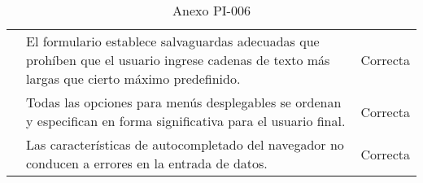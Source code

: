 \begin{table}[htpb]
\begin{tabularx}{\textwidth}{|l|X|l|}
                                         & El formulario establece salvaguardas adecuadas que prohíben que el usuario ingrese cadenas de texto más largas que cierto máximo predefinido.             & Correcta            \\ \cline{2-3} 
                                         & Todas las opciones para menús desplegables se ordenan y especifican en forma significativa para el usuario final.                                         & Correcta            \\ \cline{2-3} 
                                         & Las características de autocompletado del navegador no conducen a errores en la entrada de datos.                                                         & Correcta            \\ \hline
\end{tabularx}
\caption{Anexo PI-006}
\end{table}


